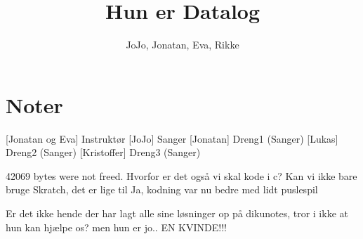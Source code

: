 \documentclass[a4paper,11pt]{article}
\title{Hun er Datalog}
\author{JoJo, Jonatan, Eva, Rikke}
\begin{document}
\maketitle
\section*{Noter}
\begin{props}
\end{props}



\begin{roles}
[Jonatan og Eva] Instruktør
 [JoJo] Sanger
 [Jonatan] Dreng1 (Sanger)
 [Lukas] Dreng2 (Sanger)
 [Kristoffer] Dreng3 (Sanger)
\end{roles}

\begin{sketch}

 42069 bytes were not freed.
 Hvorfor er det også vi skal kode i c? Kan vi ikke bare bruge Skratch, det er lige til
 Ja, kodning var nu bedre med lidt puslespil



 Er det ikke hende der har lagt alle sine løsninger op på dikunotes, tror i ikke at hun kan hjælpe os?
  men hun er jo.. EN KVINDE!!! 
\end{sketch}

\end{document}
